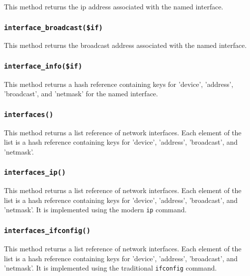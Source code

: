 \documentclass[12pt,a4paper]{article}
\begin{document}
This method returns the ip address associated with the named interface.

\subsubsection*{\texttt{interface\_broadcast(\$if)}\label{xPL::Base_interface_broadcast_if_}}


This method returns the broadcast address associated with the named
interface.

\subsubsection*{\texttt{interface\_info(\$if)}\label{xPL::Base_interface_info_if_}}


This method returns a hash reference containing keys for 'device',
'address', 'broadcast', and 'netmask' for the named interface.

\subsubsection*{\texttt{interfaces()}\label{xPL::Base_interfaces_}}


This method returns a list reference of network interfaces.  Each
element of the list is a hash reference containing keys for
'device', 'address', 'broadcast', and 'netmask'.

\subsubsection*{\texttt{interfaces\_ip()}\label{xPL::Base_interfaces_ip_}}


This method returns a list reference of network interfaces.  Each
element of the list is a hash reference containing keys for
'device', 'address', 'broadcast', and 'netmask'.  It is implemented
using the modern \texttt{ip} command.

\subsubsection*{\texttt{interfaces\_ifconfig()}\label{xPL::Base_interfaces_ifconfig_}}


This method returns a list reference of network interfaces.  Each
element of the list is a hash reference containing keys for
'device', 'address', 'broadcast', and 'netmask'.  It is implemented
using the traditional \texttt{ifconfig} command.
\end{document}

